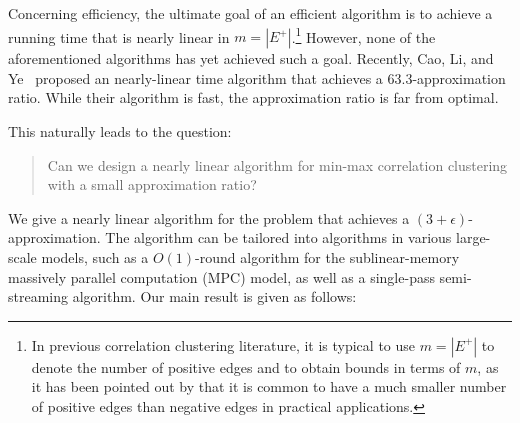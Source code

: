 Concerning efficiency, the ultimate goal of an efficient algorithm is to achieve a running time that is nearly linear in $m = |E^{+}|$.\footnote{In previous correlation clustering literature, it is typical to use $m = |E^{+}|$ to denote the number of positive edges and to obtain bounds in terms of $m$, as it has been pointed out by \cite{CDK14} that it is common to have a much smaller number of positive edges than negative edges in practical applications.} However, none of the aforementioned algorithms has yet achieved such a goal. Recently, Cao, Li, and Ye~\cite{cao2024simultaneously} proposed an nearly-linear time algorithm that achieves a $63.3$-approximation ratio. While their algorithm is fast, the approximation ratio is far from optimal.


This naturally leads to the question:

\begin{quote}
    Can we design a nearly linear algorithm for min-max correlation clustering with a small approximation ratio?
\end{quote}

We give a nearly linear algorithm for the problem that achieves a $(3+\epsilon)$-approximation. The algorithm can be tailored into algorithms in various large-scale models, such as a $O(1)$-round algorithm for the sublinear-memory massively parallel computation (MPC) model, as well as a single-pass semi-streaming algorithm. Our main result is given as follows:



